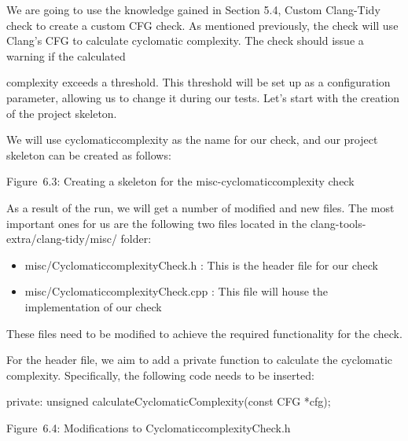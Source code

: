 We are going to use the knowledge gained in Section 5.4, Custom Clang-Tidy check to create a custom CFG check. As mentioned previously, the check will use Clang's CFG to calculate cyclomatic complexity. The check should issue a warning if the calculated

complexity exceeds a threshold. This threshold will be set up as a configuration parameter, allowing us to change it during our tests. Let's start with the creation of the project skeleton.



We will use cyclomaticcomplexity as the name for our check, and our project skeleton can be created as follows:


\begin{center}
Figure 6.3: Creating a skeleton for the misc-cyclomaticcomplexity check
\end{center}

As a result of the run, we will get a number of modified and new files. The most important ones for us are the following two files located in the clang-tools-extra/clang-tidy/misc/ folder:

\begin{itemize}
\item
misc/CyclomaticcomplexityCheck.h : This is the header file for our check

\item
misc/CyclomaticcomplexityCheck.cpp : This file will house the implementation of our check
\end{itemize}

These files need to be modified to achieve the required functionality for the check.

For the header file, we aim to add a private function to calculate the cyclomatic complexity. Specifically, the following code needs to be inserted:

\begin{cpp}
private:
  unsigned calculateCyclomaticComplexity(const CFG *cfg);
\end{cpp}

\begin{center}
Figure 6.4: Modifications to CyclomaticcomplexityCheck.h
\end{center}

